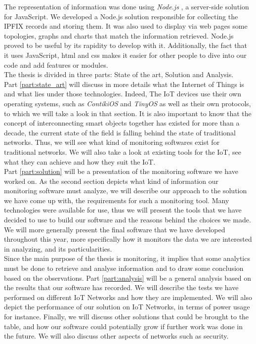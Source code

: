 The representation of information was done using \textit{Node.js} \cite{website:nodejs}, a server-side solution for JavaScript. We developed a Node.js solution responsible for collecting the IPFIX records and storing them. It was also used to display via web pages some topologies, graphs and charts that match the information retrieved. Node.js proved to be useful by its rapidity to develop with it. Additionally, the fact that it uses JavaScript, \acrshort{html} and \acrshort{css} makes it easier for other people to dive into our code and add features or modules. \\

The thesis is divided in three parts: State of the art, Solution and Analysis.\\

Part \ref{part:state_art} will discuss in more details what the Internet of Things is and what lies under those technologies. Indeed, The IoT devices use their own operating systems, such as \textit{ContikiOS} and \textit{TinyOS} as well as their own protocols, to which we will take a look in that section. It is also important to know that the concept of interconnecting smart objects together has existed for more than a decade, the current state of the field is falling behind the state of traditional networks. Thus, we will see what kind of monitoring softwares exist for traditional networks. We will also take a look at existing tools for the IoT, see what they can achieve and how they suit the IoT.\\

Part \ref{part:solution} will be a presentation of the monitoring software we have worked on. As the second section depicts what kind of information our monitoring software must analyze, we will describe our approach to the solution we have come up with, the requirements for such a monitoring tool. Many technologies were available for use, thus we will present the tools that we have decided to use to build our software and the reasons behind the choices we made. We will more generally present the final software that we have developed throughout this year, more specifically how it monitors the data we are interested in analyzing, and its particularities. \\

Since the main purpose of the thesis is monitoring, it implies that some analytics must be done to retrieve and analyse information and to draw some conclusion based on the observations. Part \ref{part:analysis} will be a general analysis based on the results that our software has recorded. We will describe the tests we have performed on different IoT Networks and how they are implemented. We will also depict the performance of our solution on IoT Networks, in terms of power usage for instance. Finally, we will discuss other solutions that could be brought to the table, and how our software could potentially grow if further work was done in the future. We will also discuss other aspects of networks such as security.
